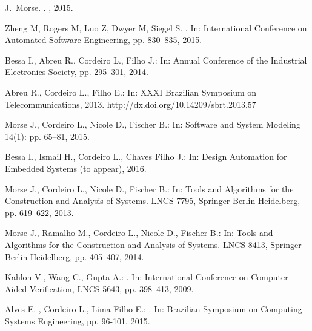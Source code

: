 \documentclass{acm_sen_article}
\begin{document}
\begin{thebibliography}{1}
J.~Morse.
.
, 2015.

Zheng M, Rogers M, Luo Z, Dwyer M, Siegel S.
.
\newblock In: International Conference on Automated Software Engineering, pp. 830--835, 2015.

Bessa I., Abreu R., Cordeiro L., Filho J.:
\newblock In: Annual Conference of the Industrial Electronics Society, pp. 295--301, 2014.

Abreu R., Cordeiro L., Filho E.:
\newblock In: XXXI Brazilian Symposium on Telecommunications, 2013.
\newblock http://dx.doi.org/10.14209/sbrt.2013.57

Morse J., Cordeiro L., Nicole D., Fischer B.:
\newblock In: Software and System Modeling 14(1): pp. 65--81, 2015.

Bessa I., Ismail H., Cordeiro L., Chaves Filho J.:
\newblock In: Design Automation for Embedded Systems (to appear), 2016.

Morse J., Cordeiro L., Nicole D., Fischer B.:
\newblock In: Tools and Algorithms for the Construction and Analysis of
  Systems. LNCS 7795, Springer Berlin Heidelberg, pp. 619--622, 2013.

Morse J., Ramalho M., Cordeiro L., Nicole D., Fischer B.:
\newblock In: Tools and Algorithms for the Construction and Analysis of
  Systems. LNCS 8413, Springer Berlin Heidelberg, pp. 405--407, 2014.

Kahlon V., Wang C., Gupta A.:
.
\newblock In: International Conference on Computer-Aided Verification, LNCS 5643, pp. 398--413, 2009.

Alves E. , Cordeiro L., Lima Filho E.:
. 
\newblock In: Brazilian Symposium on Computing Systems Engineering, pp. 96-101, 2015.


\end{thebibliography}
\end{document}

